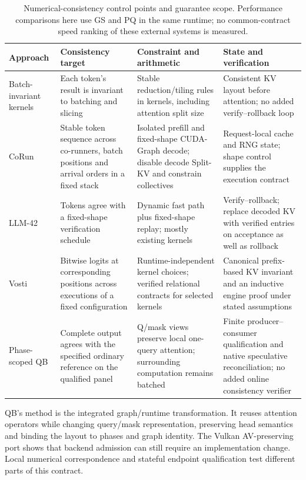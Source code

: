 \begin{table}[t]\centering\small
\caption{Numerical-consistency control points and guarantee scope. Performance comparisons here use GS and PQ in the same runtime; no common-contract speed ranking of these external systems is measured.}\label{tab:relatedmechanisms}
\begin{tabularx}{\textwidth}{@{}>{\raggedright\arraybackslash}p{2.3cm}>{\raggedright\arraybackslash}p{3.3cm}YY@{}}\toprule
Approach & Consistency target & Constraint and arithmetic & State and verification\\\midrule
Batch-invariant kernels~\cite{thinkingmachines}
& Each token's result is invariant to batching and slicing
& Stable reduction/tiling rules in kernels, including attention split size
& Consistent KV layout before attention; no added verify--rollback loop\\
CoRun~\cite{corun}
& Stable token sequence across co-runners, batch positions and arrival orders in a fixed stack
& Isolated prefill and fixed-shape CUDA-Graph decode; disable decode Split-KV and constrain collectives
& Request-local cache and RNG state; shape control supplies the execution contract\\
LLM-42~\cite{llm42}
& Tokens agree with a fixed-shape verification schedule
& Dynamic fast path plus fixed-shape replay; mostly existing kernels
& Verify--rollback; replace decoded KV with verified entries on acceptance as well as rollback\\
Vosti~\cite{vosti}
& Bitwise logits at corresponding positions across executions of a fixed configuration
& Runtime-independent kernel choices; verified relational contracts for selected kernels
& Canonical prefix-based KV invariant and an inductive engine proof under stated assumptions\\
Phase-scoped QB
& Complete output agrees with the specified ordinary reference on the qualified panel
& Q/mask views preserve local one-query attention; surrounding computation remains batched
& Finite producer--consumer qualification and native speculative reconciliation; no added online consistency verifier\\\bottomrule
\end{tabularx}
\end{table}

QB's method is the integrated graph/runtime transformation. It reuses attention operators while changing query/mask representation, preserving head semantics and binding the layout to phases and graph identity. The Vulkan AV-preserving port shows that backend admission can still require an implementation change. Local numerical correspondence and stateful endpoint qualification test different parts of this contract.

